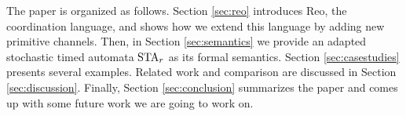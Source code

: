 The paper is organized as follows. Section \ref{sec:reo} introduces Reo, the coordination language, and shows how we extend this language by adding new primitive channels. Then, in Section \ref{sec:semantics} we provide an adapted stochastic timed automata $\mbox{STA}_r$ as its formal semantics. Section \ref{sec:casestudies} presents several examples. Related work and comparison are discussed in Section \ref{sec:discussion}. Finally, Section \ref{sec:conclusion} summarizes the paper and comes up with some future work we are going to work on.
